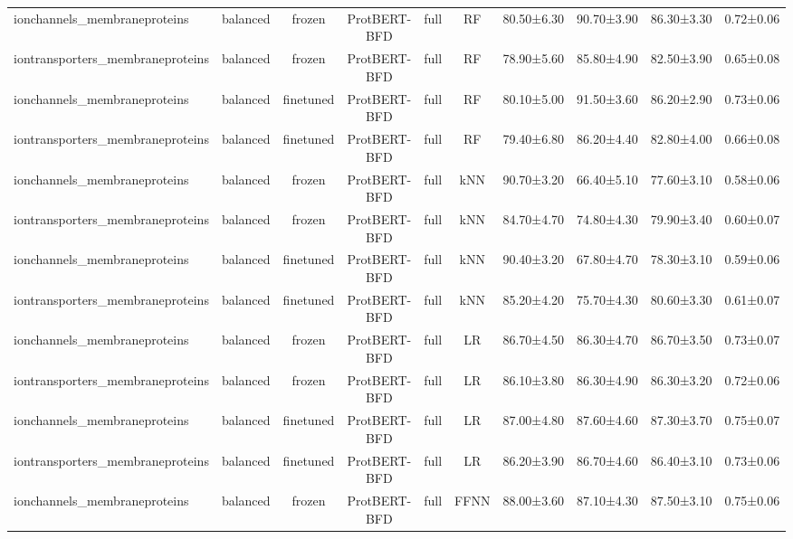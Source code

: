\begin{tabular}{lcccccc}
    ionchannels\_membraneproteins &   balanced &         frozen & ProtBERT-BFD &      full &         RF &  80.50±6.30 &  90.70±3.90 &  86.30±3.30 & 0.72±0.06 \\
iontransporters\_membraneproteins &   balanced &         frozen & ProtBERT-BFD &      full &         RF &  78.90±5.60 &  85.80±4.90 &  82.50±3.90 & 0.65±0.08 \\
    ionchannels\_membraneproteins &   balanced &      finetuned & ProtBERT-BFD &      full &         RF &  80.10±5.00 &  91.50±3.60 &  86.20±2.90 & 0.73±0.06 \\
iontransporters\_membraneproteins &   balanced &      finetuned & ProtBERT-BFD &      full &         RF &  79.40±6.80 &  86.20±4.40 &  82.80±4.00 & 0.66±0.08 \\
    ionchannels\_membraneproteins &   balanced &         frozen & ProtBERT-BFD &      full &        kNN &  90.70±3.20 &  66.40±5.10 &  77.60±3.10 & 0.58±0.06 \\
iontransporters\_membraneproteins &   balanced &         frozen & ProtBERT-BFD &      full &        kNN &  84.70±4.70 &  74.80±4.30 &  79.90±3.40 & 0.60±0.07 \\
    ionchannels\_membraneproteins &   balanced &      finetuned & ProtBERT-BFD &      full &        kNN &  90.40±3.20 &  67.80±4.70 &  78.30±3.10 & 0.59±0.06 \\
iontransporters\_membraneproteins &   balanced &      finetuned & ProtBERT-BFD &      full &        kNN &  85.20±4.20 &  75.70±4.30 &  80.60±3.30 & 0.61±0.07 \\
    ionchannels\_membraneproteins &   balanced &         frozen & ProtBERT-BFD &      full &         LR &  86.70±4.50 &  86.30±4.70 &  86.70±3.50 & 0.73±0.07 \\
iontransporters\_membraneproteins &   balanced &         frozen & ProtBERT-BFD &      full &         LR &  86.10±3.80 &  86.30±4.90 &  86.30±3.20 & 0.72±0.06 \\
    ionchannels\_membraneproteins &   balanced &      finetuned & ProtBERT-BFD &      full &         LR &  87.00±4.80 &  87.60±4.60 &  87.30±3.70 & 0.75±0.07 \\
iontransporters\_membraneproteins &   balanced &      finetuned & ProtBERT-BFD &      full &         LR &  86.20±3.90 &  86.70±4.60 &  86.40±3.10 & 0.73±0.06 \\
    ionchannels\_membraneproteins &   balanced &         frozen & ProtBERT-BFD &      full &       FFNN &  88.00±3.60 &  87.10±4.30 &  87.50±3.10 & 0.75±0.06 \\

\end{tabular}
